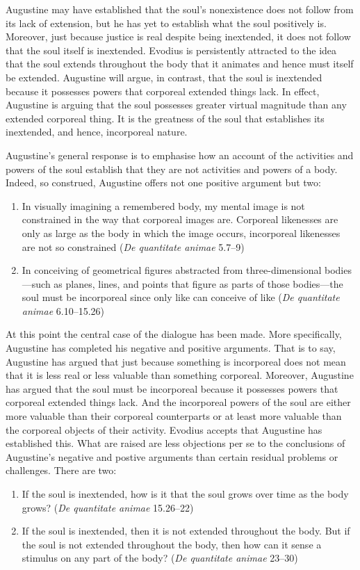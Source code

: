 \documentclass[12pt]{article}
\begin{document}
Augustine may have established that the soul’s nonexistence does not follow from its lack of extension, but he has yet to establish what the soul positively is. Moreover, just because justice is real despite being inextended, it does not follow that the soul itself is inextended. Evodius is persistently attracted to the idea that the soul extends throughout the body that it animates and hence must itself be extended. Augustine will argue, in contrast, that the soul is inextended because it possesses powers that corporeal extended things lack. In effect, Augustine is arguing that the soul possesses greater virtual magnitude than any extended corporeal thing. It is the greatness of the soul that establishes its inextended, and hence, incorporeal nature.

Augustine’s general response is to emphasise how an account of the activities and powers of the soul establish that they are not activities and powers of a body. Indeed, so construed, Augustine offers not one positive argument but two:
\begin{enumerate}
	\item In visually imagining a remembered body, my mental image is not constrained in the way that corporeal images are. Corporeal likenesses are only as large as the body in which the image occurs, incorporeal likenesses are not so constrained (\emph{De quantitate animae} 5.7–9)
	\item In conceiving of geometrical figures abstracted from three-dimensional bodies—such as planes, lines, and points that figure as parts of those bodies—the soul must be incorporeal since only like can conceive of like (\emph{De quantitate animae} 6.10–15.26)
\end{enumerate}

At this point the central case of the dialogue has been made. More specifically, Augustine has completed his negative and positive arguments. That is to say, Augustine has argued that just because something is incorporeal does not mean that it is less real or less valuable than something corporeal. Moreover, Augustine has argued that the soul must be incorporeal because it possesses powers that corporeal extended things lack. And the incorporeal powers of the soul are either more valuable than their corporeal counterparts or at least more valuable than the corporeal objects of their activity. Evodius accepts that Augustine has established this. What are raised are less objections per se to the conclusions of Augustine's negative and postive arguments than certain residual problems or challenges. There are two:
\begin{enumerate}
	\item If the soul is inextended, how is it that the soul grows over time as the body grows? (\emph{De quantitate animae} 15.26–22)
	\item If the soul is inextended, then it is not extended throughout the body. But if the soul is not extended throughout the body, then how can it sense a stimulus on any part of the body? (\emph{De quantitate animae} 23–30)
\end{enumerate}
	
\end{document}
